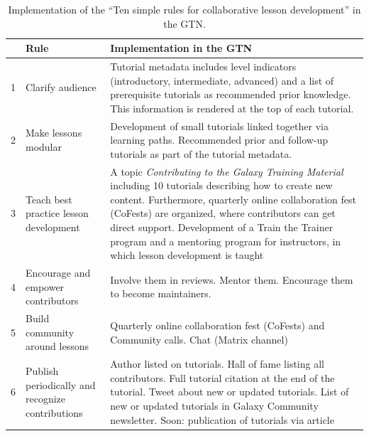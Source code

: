 \begin{table}[h!t]
  \captionsetup{margin=-2in}    
  \caption{Implementation of the ``Ten simple rules for collaborative lesson development'' \cite{Devenyi_2018} in the GTN.}
    \label{S1_Table}
	\centering
	\begin{tabular}{|l|p{}|p{}|}
	     \hline \rule{0pt}{3.6ex}
		 &\textbf{Rule}                                      & \textbf{Implementation in the GTN}\\
		\hline
		\rule{0pt}{3.6ex}
		1 & Clarify audience                                    & Tutorial metadata includes level indicators (introductory, intermediate, advanced) and a list of prerequisite tutorials as recommended prior knowledge. This information is rendered at the top of each tutorial. \\
		
		\rule{0pt}{3.6ex}
		2 & Make lessons modular                                & Development of small tutorials linked together via learning paths. Recommended prior and follow-up tutorials as part of the tutorial metadata.  \\
		
		\rule{0pt}{3.6ex}
		3 & Teach best practice lesson development              & A topic \emph{Contributing to the Galaxy Training Material} including 10 tutorials describing how to create new content. Furthermore, quarterly online collaboration fest (CoFests) are organized, where contributors can get direct support. Development of a Train the Trainer program and a mentoring program for instructors, in which lesson development is taught \\
		
		\rule{0pt}{3.6ex}
		4 & Encourage and empower contributors                  & Involve them in reviews. Mentor them. Encourage them to become maintainers. \\
		
		\rule{0pt}{3.6ex}
		5 & Build community around lessons                      & Quarterly online collaboration fest (CoFests) and Community calls. Chat (Matrix channel) \\
		
		\rule{0pt}{3.6ex}
		6 & Publish periodically and recognize contributions    & Author listed on tutorials. Hall of fame listing all contributors. Full tutorial citation at the end of the tutorial. Tweet about new or updated tutorials. List of new or updated tutorials in Galaxy Community newsletter. Soon: publication of tutorials via article \\
		

\end{tabular}
\end{table}

